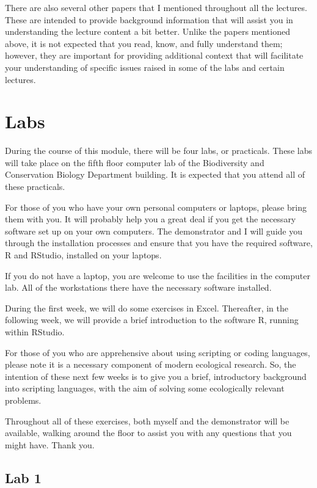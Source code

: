 \documentclass[
  10pt,
]{book}
\begin{document}
There are also several other papers that I mentioned throughout all the
lectures. These are intended to provide background information that will
assist you in understanding the lecture content a bit better. Unlike the
papers mentioned above, it is not expected that you read, know, and
fully understand them; however, they are important for providing
additional context that will facilitate your understanding of specific
issues raised in some of the labs and certain lectures.

\section{Labs}\label{labs}

During the course of this module, there will be four labs, or
practicals. These labs will take place on the fifth floor computer lab
of the Biodiversity and Conservation Biology Department building. It is
expected that you attend all of these practicals.

For those of you who have your own personal computers or laptops, please
bring them with you. It will probably help you a great deal if you get
the necessary software set up on your own computers. The demonstrator
and I will guide you through the installation processes and ensure that
you have the required software, R and RStudio, installed on your
laptops.

If you do not have a laptop, you are welcome to use the facilities in
the computer lab. All of the workstations there have the necessary
software installed.

During the first week, we will do some exercises in Excel. Thereafter,
in the following week, we will provide a brief introduction to the
software R, running within RStudio.

For those of you who are apprehensive about using scripting or coding
languages, please note it is a necessary component of modern ecological
research. So, the intention of these next few weeks is to give you a
brief, introductory background into scripting languages, with the aim of
solving some ecologically relevant problems.

Throughout all of these exercises, both myself and the demonstrator will
be available, walking around the floor to assist you with any questions
that you might have. Thank you.

\subsection{Lab 1}\label{lab-1}
\end{document}
